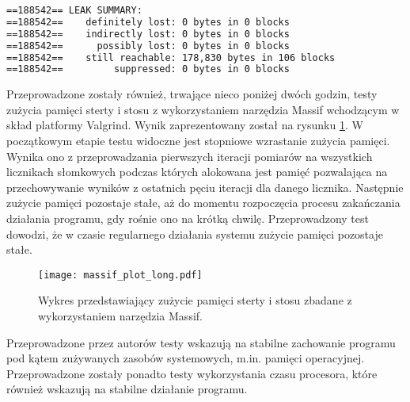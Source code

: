 \begin{lstlisting}[language=cmd,caption={Podsumowanie wycieków raportowane przez narzędzie Memcheck},frame=single, label={lst:memcheck-leak-summary}]
==188542== LEAK SUMMARY:
==188542==    definitely lost: 0 bytes in 0 blocks
==188542==    indirectly lost: 0 bytes in 0 blocks
==188542==      possibly lost: 0 bytes in 0 blocks
==188542==    still reachable: 178,830 bytes in 106 blocks
==188542==         suppressed: 0 bytes in 0 blocks
\end{lstlisting}

Przeprowadzone zostały również, trwające nieco poniżej dwóch godzin, testy zużycia pamięci sterty i stosu z wykorzystaniem narzędzia Massif wchodzącym w skład platformy Valgrind. Wynik zaprezentowany został na rysunku \ref{fig:massif-long}. W początkowym etapie testu widoczne jest stopniowe wzrastanie zużycia pamięci. Wynika ono z  przeprowadzania pierwszych iteracji pomiarów na wszystkich licznikach słomkowych podczas których alokowana jest pamięć pozwalająca na przechowywanie wyników z ostatnich pęciu iteracji dla danego licznika. Następnie zużycie pamięci pozostaje stałe, aż do momentu rozpoczęcia procesu zakańczania działania programu, gdy rośnie ono na krótką chwilę. Przeprowadzony test dowodzi, że w czasie regularnego działania systemu zużycie pamięci pozostaje stałe.

\begin{figure}[H]
    \centering
    \texttt{[image: massif\_plot\_long.pdf]}
    \caption{Wykres przedstawiający zużycie pamięci sterty i stosu zbadane z wykorzystaniem narzędzia Massif.}
    \label{fig:massif-long}
\end{figure}

Przeprowadzone przez autorów testy wskazują na stabilne zachowanie programu pod kątem zużywanych zasobów systemowych, m.in. pamięci operacyjnej. Przeprowadzone zostały ponadto testy wykorzystania czasu procesora, które również wskazują na stabilne działanie programu.
